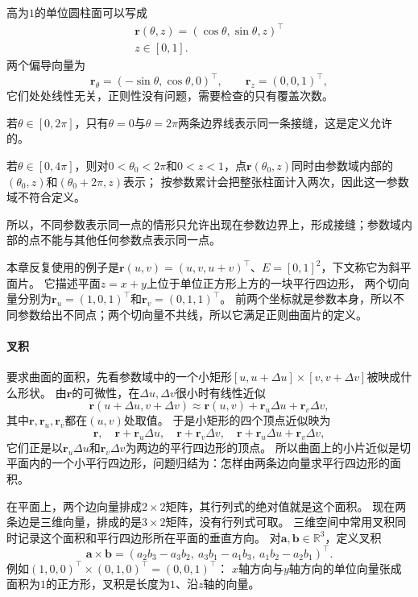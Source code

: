 \begin{example}[圆柱面的单次覆盖与二重覆盖]
\label{ex:analysis-cylinder-double-cover}
高为$1$的单位圆柱面可以写成
\[
\begin{gathered}
\bm r(\theta,z)=(\cos\theta,\sin\theta,z)^\top\\
z\in[0,1].
\end{gathered}
\]
两个偏导向量为
\[
 \bm r_\theta=(-\sin\theta,\cos\theta,0)^\top,\qquad
 \bm r_z=(0,0,1)^\top,
\]
它们处处线性无关，正则性没有问题，需要检查的只有覆盖次数。

若$\theta\in[0,2\pi]$，只有$\theta=0$与$\theta=2\pi$两条边界线表示同一条接缝，这是定义允许的。

若$\theta\in[0,4\pi]$，则对$0<\theta_0<2\pi$和$0<z<1$，点$\bm r(\theta_0,z)$同时由参数域内部的$(\theta_0,z)$和$(\theta_0+2\pi,z)$表示；
按参数累计会把整张柱面计入两次，因此这一参数域不符合定义。
\end{example}

所以，不同参数表示同一点的情形只允许出现在参数边界上，形成接缝；参数域内部的点不能与其他任何参数点表示同一点。

本章反复使用的例子是$\bm r(u,v)=(u,v,u+v)^\top$、$E=[0,1]^2$，下文称它为斜平面片。
它描述平面$z=x+y$上位于单位正方形上方的一块平行四边形，
两个切向量分别为$\bm r_u=(1,0,1)^\top$和$\bm r_v=(0,1,1)^\top$。
前两个坐标就是参数本身，所以不同参数给出不同点；两个切向量不共线，所以它满足正则曲面片的定义。

\paragraph{叉积}

要求曲面的面积，先看参数域中的一个小矩形$[u,u+\Delta u]\times[v,v+\Delta v]$被映成什么形状。
由$\bm r$的可微性，在$\Delta u,\Delta v$很小时有线性近似
\[
 \bm r(u+\Delta u,v+\Delta v)\approx\bm r(u,v)+\bm r_u\Delta u+\bm r_v\Delta v,
\]
其中$\bm r,\bm r_u,\bm r_v$都在$(u,v)$处取值。
于是小矩形的四个顶点近似映为
\[
 \bm r,\quad
 \bm r+\bm r_u\Delta u,\quad
 \bm r+\bm r_v\Delta v,\quad
 \bm r+\bm r_u\Delta u+\bm r_v\Delta v,
\]
它们正是以$\bm r_u\Delta u$和$\bm r_v\Delta v$为两边的平行四边形的顶点。
所以曲面上的小片近似是切平面内的一个小平行四边形，问题归结为：怎样由两条边向量求平行四边形的面积。

在平面上，两个边向量排成$2\times2$矩阵，其行列式的绝对值就是这个面积。
现在两条边是三维向量，排成的是$3\times2$矩阵，没有行列式可取。
三维空间中常用叉积同时记录这个面积和平行四边形所在平面的垂直方向。
对$\bm a,\bm b\in\mathbb R^3$，定义叉积
\[
 \bm a\times\bm b
 =(a_2b_3-a_3b_2,\ a_3b_1-a_1b_3,\ a_1b_2-a_2b_1)^\top.
\]
例如$(1,0,0)^\top\times(0,1,0)^\top=(0,0,1)^\top$：
$x$轴方向与$y$轴方向的单位向量张成面积为$1$的正方形，叉积是长度为$1$、沿$z$轴的向量。

